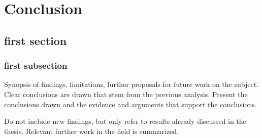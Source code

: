 \chapter{Conclusion} \label{ch:conclusion}



\section{first section}
\subsection{first subsection}
 Synopsis of findings, limitations, further proposals for future work on the subject. Clear conclusions are drawn that stem from the previous
analysis. Present the conclusions drawn and the evidence and arguments
that support the conclusions.

Do not include new findings, but only refer to results already discussed in the thesis. Relevant further work in the field is summarized.
